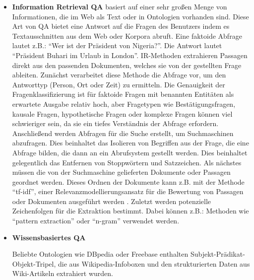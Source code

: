 \documentclass[
        ngerman,
        paper=a4,
        numbers=noendperiod,
]{scrreprt}
\begin{document}
\begin{itemize}
    \item \textbf{Information Retrieval QA} basiert auf einer sehr großen Menge von Informationen, die im Web als Text oder in Ontologien vorhanden sind. Diese Art von QA bietet eine Antwort auf die Fragen des Benutzers indem es Textausschnitten aus dem Web oder Korpora abruft. Eine faktoide Abfrage lautet z.B.: \enquote{Wer ist der Präsident von Nigeria?}. Die Antwort lautet \enquote{Präsident Buhari im Urlaub in London}. IR-Methoden extrahieren Passagen direkt aus den passenden Dokumenten, welches sie von der gestellten Frage ableiten. Zunächst verarbeitet diese Methode die Abfrage vor, um den Antworttyp (Person, Ort oder Zeit) zu ermitteln. Die Genauigkeit der Fragenklassifizierung ist für faktoide Fragen mit benannten Entitäten als erwartete Ausgabe relativ hoch, aber Fragetypen wie Bestätigungsfragen, kausale Fragen, hypothetische Fragen oder komplexe Fragen können viel schwieriger sein, da sie ein tiefes Verständnis der Abfrage erfordern. Anschließend werden Abfragen für die Suche erstellt, um Suchmaschinen abzufragen. Dies beinhaltet das Isolieren von Begriffen aus der Frage, die eine Abfrage bilden, die dann an ein Abrufsystem gestellt werden. Dies beinhaltet gelegentlich das Entfernen von Stoppwörtern und Satzzeichen. Als nächstes müssen die von der Suchmaschine gelieferten Dokumente oder Passagen geordnet werden. Dieses Ordnen der Dokumente kann z.B. mit der Methode \enquote{tf-idf}, einer Relevanzmodellierungsansatz für die Bewertung von Passagen oder Dokumenten ausgeführt werden \citep[S. 467 - 470]{Jurafsky2014SpeechProcessing}.
    Zuletzt werden potenzielle Zeichenfolgen für die Extraktion bestimmt. Dabei können z.B.: Methoden wie \enquote{pattern extraction} \citep{soubbotin2001patterns} oder \enquote{n-gram} \citep{brill2001data} verwendet werden.
    \item \textbf{Wissensbasiertes QA}
    
    Beliebte Ontologien wie DBpedia \citep{bizer2009dbpedia} oder Freebase \citep{bollacker2008freebase} enthalten Subjekt-Prädikat-Objekt-Tripel, die aus Wikipedia-Infoboxen und den strukturierten Daten aus Wiki-Artikeln extrahiert wurden. 
    

\end{itemize}
\end{document}
